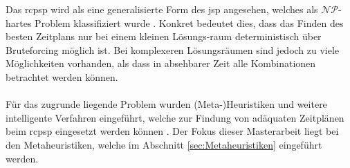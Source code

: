 Das \ac{rcpsp} wird als eine generalisierte Form des \ac{jsp} angesehen, welches als $\mathcal{NP}$-hartes Problem  klassifiziert wurde \cite[vgl.][S. 2]{kolisch_heuristic_1998}. Konkret bedeutet dies, dass das Finden des besten Zeitplans nur bei einem kleinen Lösungs-raum deterministisch über Bruteforcing möglich ist. Bei komplexeren Lösungsräumen sind jedoch zu viele Möglichkeiten vorhanden, als dass in absehbarer Zeit alle Kombinationen betrachtet werden können. \\
\\
Für das zugrunde liegende Problem wurden (Meta-)Heuristiken und weitere intelligente Verfahren eingeführt, welche zur Findung von adäquaten Zeitplänen beim \ac{rcpsp} eingesetzt werden können \cite[vgl.][S. 2]{kolisch_heuristic_1998}. Der Fokus dieser Masterarbeit liegt bei den Metaheuristiken, welche im Abschnitt \ref{sec:Metaheuristiken} eingeführt werden.
